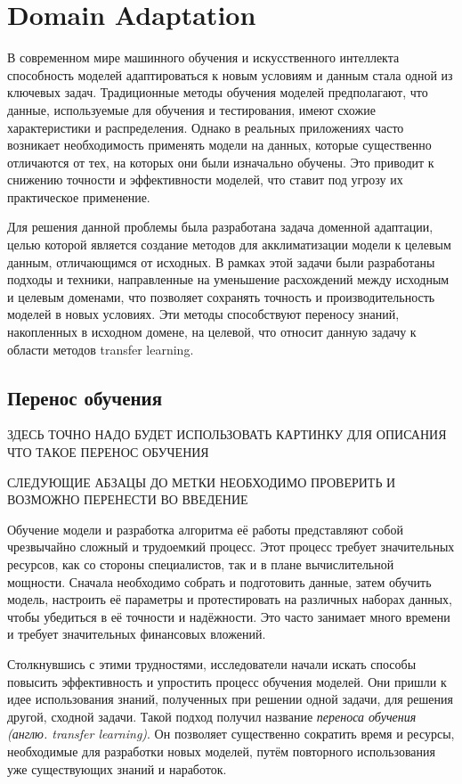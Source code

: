 \section{Domain Adaptation}
\label{sec:Chapter3} 

В современном мире машинного обучения и искусственного интеллекта способность моделей адаптироваться к новым условиям и данным стала одной из ключевых задач. Традиционные методы обучения моделей предполагают, что данные, используемые для обучения и тестирования, имеют схожие характеристики и распределения. Однако в реальных приложениях часто возникает необходимость применять модели на данных, которые существенно отличаются от тех, на которых они были изначально обучены. Это приводит к снижению точности и эффективности моделей, что ставит под угрозу их практическое применение.

Для решения данной проблемы была разработана задача доменной адаптации, целью которой является создание методов для акклиматизации модели к целевым данным, отличающимся от исходных. В рамках этой задачи были разработаны подходы и техники, направленные на уменьшение расхождений между исходным и целевым доменами, что позволяет сохранять точность и производительность моделей в новых условиях. Эти методы способствуют переносу знаний, накопленных в исходном домене, на целевой, что относит данную задачу к области методов transfer learning.

\subsection{Перенос обучения}

ЗДЕСЬ ТОЧНО НАДО БУДЕТ ИСПОЛЬЗОВАТЬ КАРТИНКУ ДЛЯ ОПИСАНИЯ ЧТО ТАКОЕ ПЕРЕНОС ОБУЧЕНИЯ

СЛЕДУЮЩИЕ АБЗАЦЫ ДО МЕТКИ НЕОБХОДИМО ПРОВЕРИТЬ И ВОЗМОЖНО ПЕРЕНЕСТИ ВО ВВЕДЕНИЕ

Обучение модели и разработка алгоритма её работы представляют собой чрезвычайно сложный и трудоемкий процесс. Этот процесс требует значительных ресурсов, как со стороны специалистов, так и в плане вычислительной мощности. Сначала необходимо собрать и подготовить данные, затем обучить модель, настроить её параметры и протестировать на различных наборах данных, чтобы убедиться в её точности и надёжности. Это часто занимает много времени и требует значительных финансовых вложений. 

Столкнувшись с этими трудностями, исследователи начали искать способы повысить эффективность и упростить процесс обучения моделей. Они пришли к идее использования знаний, полученных при решении одной задачи, для решения другой, сходной задачи. Такой подход получил название \textit{переноса обучения (англю. transfer learning)}. Он позволяет существенно сократить время и ресурсы, необходимые для разработки новых моделей, путём повторного использования уже существующих знаний и наработок.

